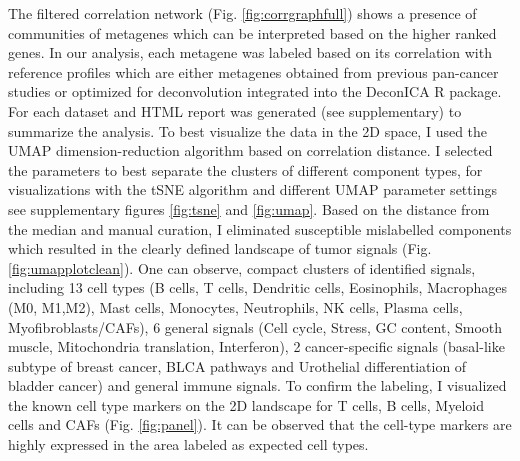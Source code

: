\documentclass[12pt,]{book}
\theoremstyle{definition}
\theoremstyle{definition}
\theoremstyle{definition}
\theoremstyle{remark}
\begin{document}
The filtered correlation network (Fig. \ref{fig:corrgraphfull}) shows a
presence of communities of metagenes which can be interpreted based on
the higher ranked genes. In our analysis, each metagene was labeled
based on its correlation with reference profiles which are either
metagenes obtained from previous pan-cancer studies \citep{Biton2014} or
optimized for deconvolution \citep{Newman2015} integrated into the
DeconICA R package. For each dataset and HTML report was generated (see
supplementary) to summarize the analysis. To best visualize the data in
the 2D space, I used the UMAP dimension-reduction algorithm based on
correlation distance. I selected the parameters to best separate the
clusters of different component types, for visualizations with the tSNE
algorithm and different UMAP parameter settings see supplementary
figures \ref{fig:tsne} and \ref{fig:umap}. Based on the distance from
the median and manual curation, I eliminated susceptible mislabelled
components which resulted in the clearly defined landscape of tumor
signals (Fig. \ref{fig:umapplotclean}). One can observe, compact
clusters of identified signals, including 13 cell types (B cells, T
cells, Dendritic cells, Eosinophils, Macrophages (M0, M1,M2), Mast
cells, Monocytes, Neutrophils, NK cells, Plasma cells,
Myofibroblasts/CAFs), 6 general signals (Cell cycle, Stress, GC content,
Smooth muscle, Mitochondria translation, Interferon), 2 cancer-specific
signals (basal-like subtype of breast cancer, BLCA pathways and
Urothelial differentiation of bladder cancer) and general immune
signals. To confirm the labeling, I visualized the known cell type
markers on the 2D landscape for T cells, B cells, Myeloid cells and CAFs
(Fig. \ref{fig:panel}). It can be observed that the cell-type markers
are highly expressed in the area labeled as expected cell types.
\end{document}

